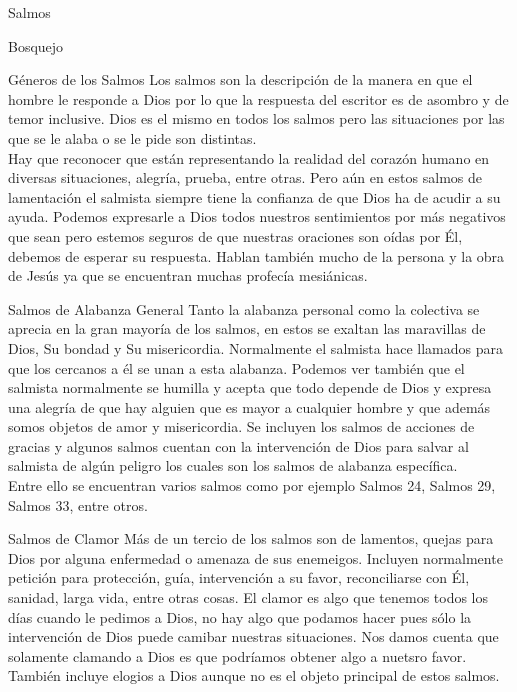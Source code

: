 \begin{section}{Salmos}
\begin{subsection}{Bosquejo}
	\end{subsection}
	\begin{subsection}{Géneros de los Salmos}
		Los salmos son la descripción de la manera en que el hombre le responde a Dios por lo que la respuesta del escritor es de asombro y de temor inclusive. Dios es el mismo en todos los salmos pero las situaciones por las que se le alaba o se le pide son distintas.\\
		Hay que reconocer que están representando la realidad del corazón humano en diversas situaciones, alegría, prueba, entre otras. Pero aún en estos salmos de lamentación el salmista siempre tiene la confianza de que Dios ha de acudir a su ayuda. Podemos expresarle a Dios todos nuestros sentimientos por más negativos que sean pero estemos seguros de que nuestras oraciones son oídas por Él, debemos de esperar su respuesta. Hablan también mucho de la persona y la obra de Jesús ya que se encuentran muchas profecía mesiánicas.
		\begin{subsubsection}{Salmos de Alabanza General}
			Tanto la alabanza personal como la colectiva se aprecia en la gran mayoría de los salmos, en estos se exaltan las maravillas de Dios, Su bondad y Su misericordia. Normalmente el salmista hace llamados para que los cercanos a él se unan a esta alabanza. Podemos ver también que el salmista normalmente se humilla y acepta que todo depende de Dios y expresa una alegría de que hay alguien que es mayor a cualquier hombre y que además somos objetos de amor y misericordia. Se incluyen los salmos de acciones de gracias y algunos salmos cuentan con la intervención de Dios para salvar al salmista de algún peligro los cuales son los salmos de alabanza específica.\\
			Entre ello se encuentran varios salmos como por ejemplo Salmos 24, Salmos 29, Salmos 33, entre otros.
		\end{subsubsection}
		\begin{subsubsection}{Salmos de Clamor}
			Más de un tercio de los salmos son de lamentos, quejas para Dios por alguna enfermedad o amenaza de sus enemeigos. Incluyen normalmente petición para protección, guía, intervención a su favor, reconciliarse con Él, sanidad, larga vida, entre otras cosas. El clamor es algo que tenemos todos los días cuando le pedimos a Dios, no hay algo que podamos hacer pues sólo la intervención de Dios puede camibar nuestras situaciones.
			\newpage
			Nos damos cuenta que solamente clamando a Dios es que podríamos obtener algo a nuetsro favor. También incluye elogios a Dios aunque no es el objeto principal de estos salmos.\\

\end{subsubsection}
\end{subsection}
\end{section}

